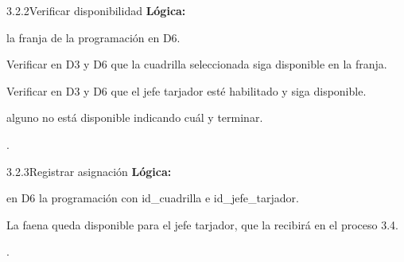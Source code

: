 \begin{minispec}{3.2.2}{Verificar disponibilidad}
\textbf{Lógica:}
\begin{logica}
    \item {} la franja de la programación en D6.
    \item Verificar en D3 y D6 que la cuadrilla seleccionada siga disponible en la franja.
    \item Verificar en D3 y D6 que el jefe tarjador esté habilitado y siga disponible.
    \item {} alguno no está disponible  
    indicando cuál y terminar.
    \item {} .
\end{logica}
\end{minispec}

\begin{minispec}{3.2.3}{Registrar asignación}
\textbf{Lógica:}
\begin{logica}
    \item {} en D6 la programación con id\_cuadrilla e id\_jefe\_tarjador.
    \item La faena queda disponible para el jefe tarjador, que la recibirá en el proceso 3.4.
    \item {} .
\end{logica}
\end{minispec}

